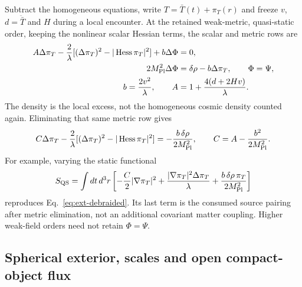 Subtract the homogeneous equations, write $T=\bar T(t)+\pi_T(r)$ and
freeze $v$, $d=\ddot{\bar T}$ and $H$ during a local encounter. At the
retained weak-metric, quasi-static order, keeping the nonlinear scalar
Hessian terms, the scalar and metric rows are
\begin{align}
 A\Delta\pi_T-\frac2\lambda
 [(\Delta\pi_T)^2-|\operatorname{Hess}\pi_T|^2]+b\Delta\Phi&=0,
 \nonumber\\
 2M_{\rm Pl}^2\Delta\Phi&=\delta\rho-b\Delta\pi_T,
 \qquad\Phi=\Psi,\nonumber\\
 b=\frac{2v^2}{\lambda},\qquad
 A&=1+\frac{4(d+2Hv)}{\lambda}.
 \label{eq:ext-qs-rows}
\end{align}
The density is the local excess, not the homogeneous cosmic density
counted again. Eliminating that same metric row gives
\begin{equation}
 C\Delta\pi_T-\frac2\lambda
 [(\Delta\pi_T)^2-|\operatorname{Hess}\pi_T|^2]
 =-\frac{b\,\delta\rho}{2M_{\rm Pl}^2},\qquad
 C=A-\frac{b^2}{2M_{\rm Pl}^2}.
 \label{eq:ext-debraided}
\end{equation}
For example, varying the static functional
\begin{equation}
 S_{\rm QS}=\int dt\,d^3r\left[-\frac C2|\nabla\pi_T|^2
 +\frac{|\nabla\pi_T|^2\Delta\pi_T}{\lambda}
 +\frac{b\,\delta\rho\,\pi_T}{2M_{\rm Pl}^2}\right]
 \label{eq:ext-qs-functional}
\end{equation}
reproduces Eq.~\eqref{eq:ext-debraided}. Its last term is the consumed
source pairing after metric elimination, not an additional covariant
matter coupling. Higher weak-field orders need not retain $\Phi=\Psi$.

\subsection{Spherical exterior, scales and open compact-object flux}

